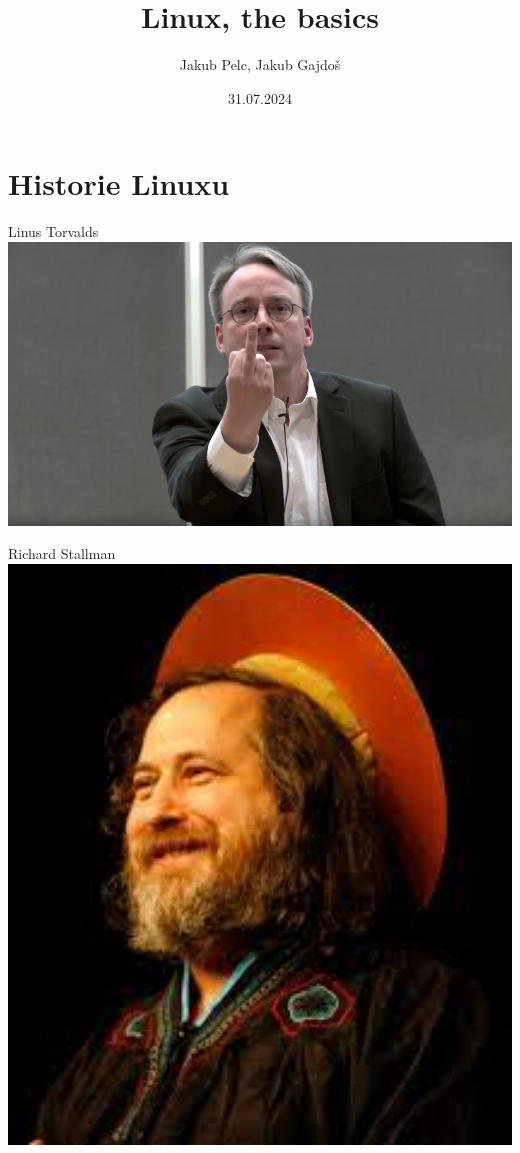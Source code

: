 \documentclass{beamer}
\title{Linux, the basics}
\date{31.07.2024}
\author{Jakub Pelc, Jakub Gajdoš}
\institute{Astronomická expedice \par 31.07.2024}
\begin{document}
	\maketitle
	\section{Historie Linuxu}
	
	\begin{frame}{Linus Torvalds}
		\centering
		\includegraphics[width=1.0\textwidth]{images/linus.png}
	\end{frame}

	\begin{frame}{Richard Stallman}
		\centering
		\includegraphics[width=1.0\textwidth]{images/stallman.png}
	\end{frame}
\end{document}
